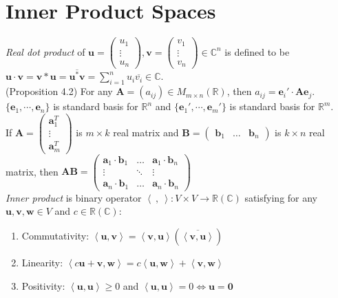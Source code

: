 \documentclass{article}
\theoremstyle{definition}
\begin{document}
\section{Inner Product Spaces}
\textit{Real dot product} of $\mathbf{u}=\begin{pmatrix}
    u_{1}\\
    \vdots\\
    u_{n}
\end{pmatrix},\mathbf{v}=\begin{pmatrix}
    v_{1}\\
    \vdots\\
    v_{n}
\end{pmatrix}\in\mathbb{C}^{n}$ is defined to be $\mathbf{u}\cdot\mathbf{v}=\mathbf{v}{*}\mathbf{u}=\overline{\mathbf{u}^{*}\mathbf{v}}=\sum_{i=1}^{n}u_{i}\overline{v_{i}}\in\mathbb{C}$.\\
(Proposition 4.2) For any $\mathbf{A}=(a_{ij})\in M_{m\times n}(\mathbb{R})$, then $a_{ij}=\mathbf{e}_{i}'\cdot\mathbf{Ae}_{j}$.\\
$\{\mathbf{e}_{1},\cdots,\mathbf{e}_{n}\}$ is standard basis for $\mathbb{R}^{n}$ and $\{\mathbf{e}_{1}',\cdots,\mathbf{e}_{m}'\}$ is standard basis for $\mathbb{R}^{m}$.\\
If $\mathbf{A}=\begin{pmatrix}
    \mathbf{a}_{1}^{T}\\
    \vdots\\
    \mathbf{a}_{m}^{T}
\end{pmatrix}$ is $m\times k$ real matrix and $\mathbf{B}=\begin{pmatrix}
    \mathbf{b}_{1} & \hdots & \mathbf{b}_{n}
\end{pmatrix}$ is $k\times n$ real matrix, then $\mathbf{AB}=\begin{pmatrix}
    \mathbf{a}_{1}\cdot\mathbf{b}_{1} & \hdots & \mathbf{a}_{1}\cdot\mathbf{b}_{n}\\
    \vdots & \ddots & \vdots\\
    \mathbf{a}_{n}\cdot\mathbf{b}_{1} & \hdots & \mathbf{a}_{n}\cdot\mathbf{b}_{n}
\end{pmatrix}$\\
\textit{Inner product} is binary operator $\left<\ ,\ \right>:V\times V\rightarrow\mathbb{R}(\mathbb{C})$ satisfying for any $\mathbf{u},\mathbf{v},\mathbf{w}\in V$ and $c\in\mathbb{R}(\mathbb{C})$:
\begin{enumerate}
    \item Commutativity: $\left<\mathbf{u},\mathbf{v}\right>=\left<\mathbf{v},\mathbf{u}\right>(\overline{\left<\mathbf{v},\mathbf{u}\right>})$
    \item Linearity: $\left<c\mathbf{u}+\mathbf{v},\mathbf{w}\right>=c\left<\mathbf{u},\mathbf{w}\right>+\left<\mathbf{v},\mathbf{w}\right>$
    \item Positivity: $\left<\mathbf{u},\mathbf{u}\right>\geq 0$ and $\left<\mathbf{u},\mathbf{u}\right>=0\Leftrightarrow\mathbf{u}=\mathbf{0}$
\end{enumerate}
\end{document}
